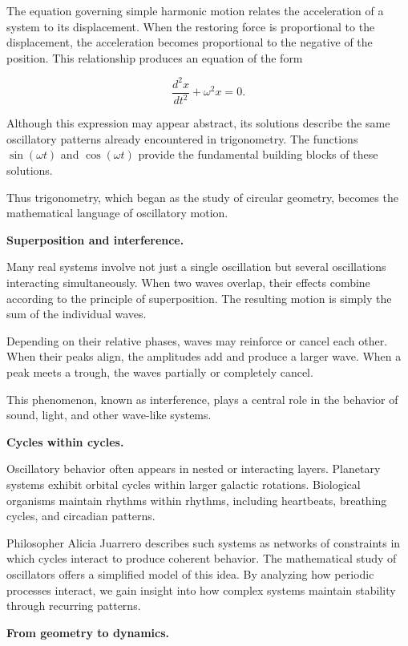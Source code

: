 \documentclass[11pt, openany]{book}
\theoremstyle{plain}
\theoremstyle{definition}
\theoremstyle{remark}
\begin{document}
The equation governing simple harmonic motion relates the acceleration
of a system to its displacement. When the restoring force is
proportional to the displacement, the acceleration becomes proportional
to the negative of the position. This relationship produces an equation
of the form

\[
\frac{d^2x}{dt^2} + \omega^2 x = 0 .
\]

Although this expression may appear abstract, its solutions describe the
same oscillatory patterns already encountered in trigonometry. The
functions $\sin(\omega t)$ and $\cos(\omega t)$ provide the fundamental
building blocks of these solutions.

Thus trigonometry, which began as the study of circular geometry,
becomes the mathematical language of oscillatory motion.

\medskip

\textbf{Superposition and interference.}

Many real systems involve not just a single oscillation but several
oscillations interacting simultaneously. When two waves overlap, their
effects combine according to the principle of superposition. The
resulting motion is simply the sum of the individual waves.

Depending on their relative phases, waves may reinforce or cancel each
other. When their peaks align, the amplitudes add and produce a larger
wave. When a peak meets a trough, the waves partially or completely
cancel.

This phenomenon, known as interference, plays a central role in the
behavior of sound, light, and other wave-like systems.

\medskip

\textbf{Cycles within cycles.}

Oscillatory behavior often appears in nested or interacting layers.
Planetary systems exhibit orbital cycles within larger galactic
rotations. Biological organisms maintain rhythms within rhythms,
including heartbeats, breathing cycles, and circadian patterns.

Philosopher Alicia Juarrero describes such systems as networks of
constraints in which cycles interact to produce coherent behavior. The
mathematical study of oscillators offers a simplified model of this idea.
By analyzing how periodic processes interact, we gain insight into how
complex systems maintain stability through recurring patterns.

\medskip

\textbf{From geometry to dynamics.}
\end{document}
